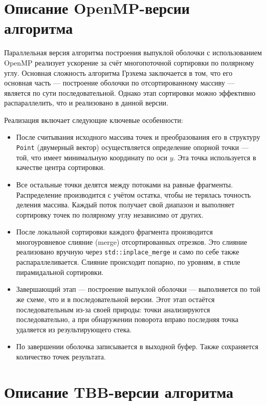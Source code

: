 \documentclass[12pt,a4paper]{extarticle}
\begin{document}
\section{Описание OpenMP-версии алгоритма}

Параллельная версия алгоритма построения выпуклой оболочки с использованием OpenMP реализует ускорение за счёт многопоточной сортировки по полярному углу. Основная сложность алгоритма Грэхема заключается в том, что его основная часть — построение оболочки по отсортированному массиву — является по сути последовательной. Однако этап сортировки можно эффективно распараллелить, что и реализовано в данной версии.

Реализация включает следующие ключевые особенности:

\begin{itemize}
    \item После считывания исходного массива точек и преобразования его в структуру \texttt{Point} (двумерный вектор) осуществляется определение опорной точки — той, что имеет минимальную координату по оси $y$. Эта точка используется в качестве центра сортировки.
    
    \item Все остальные точки делятся между потоками на равные фрагменты. Распределение производится с учётом остатка, чтобы не терялась точность деления массива. Каждый поток получает свой диапазон и выполняет сортировку точек по полярному углу независимо от других.

    \item После локальной сортировки каждого фрагмента производится многоуровневое слияние (merge) отсортированных отрезков. Это слияние реализовано вручную через \texttt{std::inplace\_merge} и само по себе также распараллеливается. Слияние происходит попарно, по уровням, в стиле пирамидальной сортировки.

    \item Завершающий этап — построение выпуклой оболочки — выполняется по той же схеме, что и в последовательной версии. Этот этап остаётся последовательным из-за своей природы: точки анализируются последовательно, а при обнаружении поворота вправо последняя точка удаляется из результирующего стека.

    \item По завершении оболочка записывается в выходной буфер. Также сохраняется количество точек результата.
\end{itemize}

\section{Описание TBB-версии алгоритма}
\end{document}
